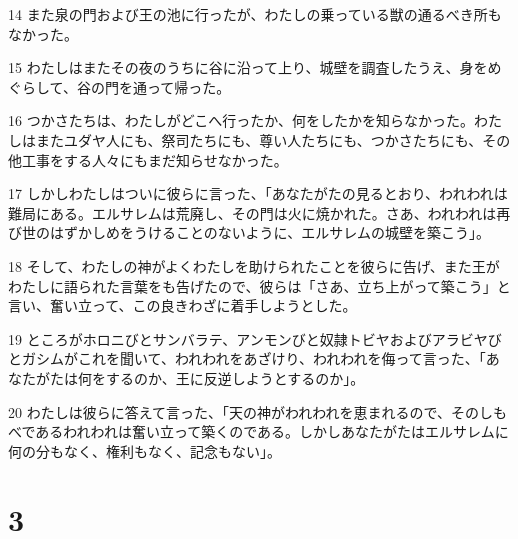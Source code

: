 \par 14 また泉の門および王の池に行ったが、わたしの乗っている獣の通るべき所もなかった。
\par 15 わたしはまたその夜のうちに谷に沿って上り、城壁を調査したうえ、身をめぐらして、谷の門を通って帰った。
\par 16 つかさたちは、わたしがどこへ行ったか、何をしたかを知らなかった。わたしはまたユダヤ人にも、祭司たちにも、尊い人たちにも、つかさたちにも、その他工事をする人々にもまだ知らせなかった。
\par 17 しかしわたしはついに彼らに言った、「あなたがたの見るとおり、われわれは難局にある。エルサレムは荒廃し、その門は火に焼かれた。さあ、われわれは再び世のはずかしめをうけることのないように、エルサレムの城壁を築こう」。
\par 18 そして、わたしの神がよくわたしを助けられたことを彼らに告げ、また王がわたしに語られた言葉をも告げたので、彼らは「さあ、立ち上がって築こう」と言い、奮い立って、この良きわざに着手しようとした。
\par 19 ところがホロニびとサンバラテ、アンモンびと奴隷トビヤおよびアラビヤびとガシムがこれを聞いて、われわれをあざけり、われわれを侮って言った、「あなたがたは何をするのか、王に反逆しようとするのか」。
\par 20 わたしは彼らに答えて言った、「天の神がわれわれを恵まれるので、そのしもべであるわれわれは奮い立って築くのである。しかしあなたがたはエルサレムに何の分もなく、権利もなく、記念もない」。

\chapter{3}

